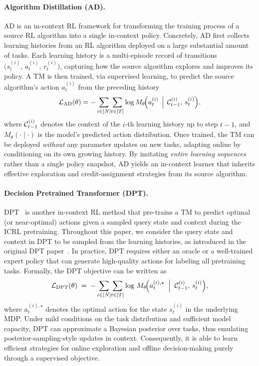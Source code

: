 \documentclass{article}
\newcommand{\gL}{\mathcal{L}}
\begin{document}
\paragraph{Algorithm Distillation (AD).}
AD \citep{laskin2022context} is an in-context RL framework for transforming the training process of a source RL algorithm into a single in-context policy. Concretely, AD first collects learning histories from an RL algorithm deployed on a large substantial amount of tasks. Each learning history is a multi-episode record of transitions $\bigl(s_t^{(i)},\,a_t^{(i)},\,r_t^{(i)}\bigr)$, capturing how the source algorithm explores and improves its policy. A TM is then trained, via supervised learning, to predict the source algorithm’s action $a_t^{(i)}$ from the preceding history
\begin{equation}
\label{eq:ad}
\gL_{\mathrm{AD}}(\theta)
=
- \sum_{i \in [N]}\!
  \sum_{t \in [T]}
  \log
  M_{\theta}\!\Bigl(
      a_t^{(i)}
      \,\Bigm|\,
      \ccalC_{t-1}^{(i)},\,  
      s_t^{(i)}
  \Bigr),
\end{equation}
%
 where ${\mathcal C}_{t-1}^{(i)}$ denotes the context of the $i$-th learning history up to step $t{-}1$, and $M_\theta(\cdot\mid\cdot)$ is the model’s predicted action distribution. Once trained, the TM can be deployed \emph{without} any parameter updates on new tasks, adapting online by conditioning on its own growing history. By imitating \emph{entire learning sequences} rather than a single policy snapshot, AD yields an in-context learner that inherits effective exploration and credit-assignment strategies from its source algorithm.


\paragraph{Decision Pretrained Transformer (DPT).}
DPT~\cite{lee2024supervised} is another in-context RL method that pre-trains a TM to predict optimal (or near-optimal) actions given a sampled query state and context during the ICRL pretraining. Throughout this paper, we consider the query state and context in DPT to be sampled from the learning histories, as introduced in the original DPT paper~\cite{lee2024supervised}.
In practice, DPT requires either an oracle or a well-trained expert policy that can generate high-quality actions for labeling all pretraining tasks.
Formally, the DPT objective can be written as
\begin{equation}
    \label{eq:dpt2}
    \gL_{\mathrm{DPT}}(\theta)
    \;=\;
- \sum_{i \in [N]}\!
  \sum_{t \in [T]}
      \log\,
      M_{\theta}\!\Bigl(
        a_t^{(i), \star}
        \;\Bigm|\;
        \ccalC_{t-1}^{(i)},\,  
         s_t^{(i)}
      \Bigr),
\end{equation}
where $a_t^{(i), \star}$ denotes the optimal action for the state $s_t^{(i)}$ in the underlying MDP. 
Under mild conditions on the task distribution and sufficient model capacity, DPT can approximate a Bayesian posterior over tasks, thus emulating posterior-sampling-style updates in context. Consequently, it is able to learn efficient strategies for online exploration and offline decision-making purely through a supervised objective.
\end{document}
